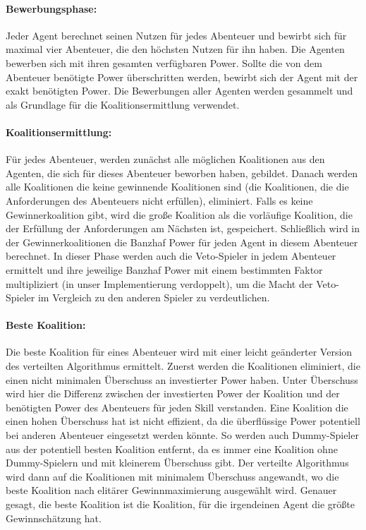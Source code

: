 \documentclass[fleqn,10pt]{SelfArx} %
\begin{document}
\paragraph{Bewerbungsphase:}
Jeder Agent berechnet seinen Nutzen für jedes Abenteuer und bewirbt sich für maximal vier Abenteuer, die den höchsten Nutzen für ihn haben. Die Agenten bewerben sich mit ihren gesamten verfügbaren Power. Sollte die von dem Abenteuer benötigte Power überschritten werden, bewirbt sich der Agent mit der exakt benötigten Power. Die Bewerbungen aller Agenten werden gesammelt und als Grundlage für die Koalitionsermittlung verwendet. 

\paragraph{Koalitionsermittlung:}
Für jedes Abenteuer, werden zunächst alle möglichen Koalitionen aus den Agenten, die sich für dieses Abenteuer beworben haben, gebildet. Danach werden alle Koalitionen die keine gewinnende Koalitionen sind (die Koalitionen, die die Anforderungen des Abenteuers nicht erfüllen), eliminiert. Falls es keine Gewinnerkoalition gibt, wird die große Koalition als die vorläufige Koalition, die der Erfüllung der Anforderungen am Nächsten ist, gespeichert. Schließlich wird in der Gewinnerkoalitionen die Banzhaf Power für jeden Agent in diesem Abenteuer berechnet. In dieser Phase werden auch die Veto-Spieler in jedem Abenteuer ermittelt und ihre jeweilige Banzhaf Power mit einem bestimmten Faktor multipliziert (in unser Implementierung verdoppelt), um die Macht der Veto-Spieler im Vergleich zu den anderen Spieler zu verdeutlichen. 

\paragraph{Beste Koalition:}
Die beste Koalition für eines Abenteuer wird mit einer leicht geänderter Version des verteilten Algorithmus ermittelt. Zuerst werden die Koalitionen eliminiert, die einen nicht minimalen Überschuss an investierter Power haben. Unter Überschuss wird hier die Differenz zwischen der investierten Power der Koalition und der benötigten Power des Abenteuers für jeden Skill verstanden. Eine Koalition die einen hohen Überschuss hat ist nicht effizient, da die überflüssige Power potentiell bei anderen Abenteuer eingesetzt werden könnte. So werden auch Dummy-Spieler aus der potentiell besten Koalition entfernt, da es immer eine Koalition ohne Dummy-Spielern und mit kleinerem Überschuss gibt. Der verteilte Algorithmus wird dann auf die Koalitionen mit minimalem Überschuss angewandt, wo die beste Koalition nach elitärer Gewinnmaximierung ausgewählt wird. Genauer gesagt, die beste Koalition ist die Koalition, für die irgendeinen Agent die größte Gewinnschätzung hat.
\end{document}
